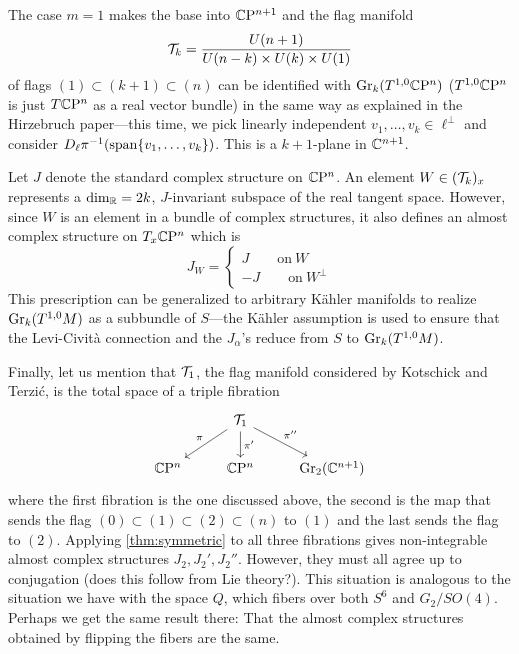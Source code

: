 \documentclass{scrartcl}
\begin{document}
\medskip

The case $m=1$ makes the base into $\mathbb{C}\mathrm{P}^{n+1}$ and the flag manifold
\begin{equation*}
	\mathcal{T}_k=\frac{U(n+1)}{U(n-k)\times U(k)\times U(1)}
\end{equation*}
of flags $(1)\subset (k+1)\subset (n)$ can be identified with $\operatorname{Gr}_k(T^{1,0}\mathbb{C}\mathrm{P}^n)$ ($T^{1,0}\mathbb{C}\mathrm{P}^n$ is just $T\mathbb{C}\mathrm{P}^n$ as a real vector bundle) in the same way as explained in the Hirzebruch paper---this time, we pick linearly independent $v_1,\dots,v_k\in \ell^\perp$ and consider $D_\ell \pi^{-1}(\operatorname{span}\{v_1,\dots, v_k\})$. This is a $k+1$-plane in $\mathbb{C}^{n+1}$.

\medskip

Let $J$ denote the standard complex structure on $\mathbb{C}\mathrm{P}^n$. An element $W\in (\mathcal{T}_k)_x$ represents a $\dim_{\mathbb{R}}=2k$, $J$-invariant subspace of the real tangent space. However, since $W$ is an element in a bundle of complex structures, it also defines an almost complex structure on $T_x \mathbb{C}\mathrm{P}^n$ which is
\begin{equation*}
	J_W=
	\begin{cases}
		J\qquad \text{on}\ W\\
		-J\qquad \text{on}\ W^\perp
	\end{cases}
\end{equation*}
This prescription can be generalized to arbitrary K\"{a}hler manifolds to realize $\operatorname{Gr}_k(T^{1,0}M)$ as a subbundle of $S$---the K\"{a}hler assumption is used to ensure that the Levi-Civit\`{a} connection and the $J_\alpha$'s reduce from $S$ to $\operatorname{Gr}_k(T^{1,0}M)$. 

\medskip

Finally, let us mention that $\mathcal{T}_1$, the flag manifold considered by Kotschick and Terzi\'{c}, is the total space of a triple fibration
\begin{equation*}
	\begin{tikzcd}
		& \mc T_1 \ar[dl,"\pi"'] \ar[d,"\pi'"] \ar[dr,"\pi''"] \\
		\CP^n & \CP^n & \Gr_2(\C^{n+1})
	\end{tikzcd}
\end{equation*}
where the first fibration is the one discussed above, the second is the map that sends the flag $(0)\subset(1)\subset (2)\subset (n)$ to $(1)$ and the last sends the flag to $(2)$. Applying \cref{thm:symmetric} to all three fibrations gives non-integrable almost complex structures $J_2,J_2',J_2''$. However, they must all agree up to conjugation (does this follow from Lie theory?). This situation is analogous to the situation we have with the space $Q$, which fibers over both $S^6$ and $G_2/SO(4)$. Perhaps we get the same result there: That the almost complex structures obtained by flipping the fibers are the same.
\end{document}
